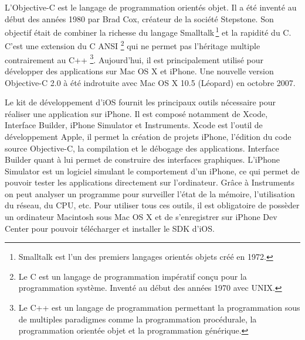 	L'Objective-C est le langage de programmation orientés objet. Il a été inventé au début des années 1980 par Brad Cox, créateur de la société Stepstone. Son objectif était de combiner la richesse du langage Smalltalk\,\footnote{Smalltalk est l'un des premiers langages orientés objets créé en 1972.} et la rapidité du C.  C'est une extension du C ANSI \footnote{Le C est un langage de programmation impératif conçu pour la programmation système. Inventé au début des années 1970 avec UNIX.} qui ne permet pas l'héritage multiple contrairement au C++ \footnote{Le C++ est un langage de programmation permettant la programmation sous de multiples paradigmes comme la programmation procédurale, la programmation orientée objet et la programmation générique.}. Aujourd'hui, il est principalement utilisé pour développer des applications sur Mac OS X et iPhone. Une nouvelle version Objective-C 2.0 à été indrotuite avec Mac OS X 10.5 (Léopard) en octobre 2007.
			
	Le kit de développement d'iOS fournit les principaux outils nécessaire pour réaliser une application sur iPhone. Il est composé notamment de Xcode, Interface Builder, iPhone Simulator et Instruments. Xcode est l'outil de développement Apple, il permet la création de projets iPhone, l’édition du code source Objective-C, la compilation et le débogage des applications. Interface Builder quant à lui permet de construire des interfaces graphiques. L'iPhone Simulator est un logiciel simulant le comportement d'un iPhone, ce qui permet de pouvoir tester les applications directement sur l'ordinateur. Grâce à Instruments on peut analyser un programme pour surveiller l’état de la mémoire, l’utilisation du réseau, du CPU, etc. Pour utiliser tous ces outils, il est obligatoire de possèder un ordinateur Macintosh sous Mac OS X et de s'enregistrer sur iPhone Dev Center pour pouvoir télécharger et installer le SDK d'iOS.